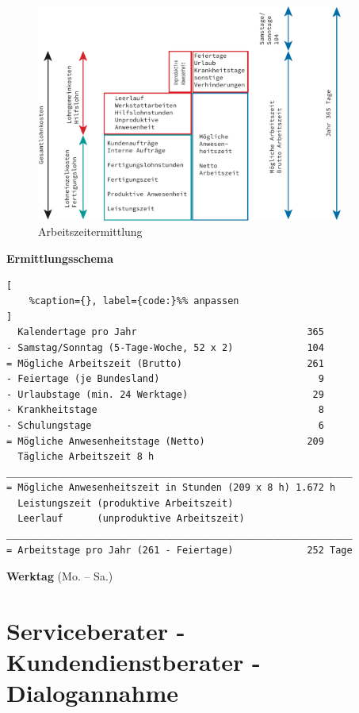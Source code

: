 \begin{figure}[!ht]%
\centering
\includegraphics[width=0.9\textwidth]{images/Skizze/Arbeitszeitermittlung.pdf}
\caption{Arbeitszeitermittlung}
\end{figure}

\textbf{Ermittlungsschema}

\lstset{language=Python}%
\begin{lstlisting}[
	%caption={}, label={code:}%% anpassen
]
  Kalendertage pro Jahr                              365
- Samstag/Sonntag (5-Tage-Woche, 52 x 2)             104
= Mögliche Arbeitszeit (Brutto)                      261
- Feiertage (je Bundesland)                            9
- Urlaubstage (min. 24 Werktage)                      29
- Krankheitstage                                       8
- Schulungstage                                        6 
= Mögliche Anwesenheitstage (Netto)                  209
  Tägliche Arbeitszeit 8 h 
_____________________________________________________________
= Mögliche Anwesenheitszeit in Stunden (209 x 8 h) 1.672 h
  Leistungszeit (produktive Arbeitszeit)
  Leerlauf      (unproduktive Arbeitszeit)
_____________________________________________________________
= Arbeitstage pro Jahr (261 - Feiertage)             252 Tage
\end{lstlisting}

\textbf{Werktag} (Mo. -- Sa.)

\newpage

\section{Serviceberater - Kundendienstberater -
Dialogannahme}\label{serviceberater-kundendienstberater-dialogannahme}


